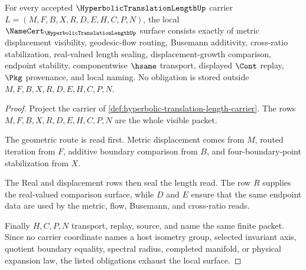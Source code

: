 \begin{theorem}
\label{thm:hyperbolic-translation-length-namecert-obligations}
For every accepted $\HyperbolicTranslationLengthUp$ carrier $L=(M,F,B,X,R,D,E,H,C,P,N)$, the local $\NameCert_{\HyperbolicTranslationLengthUp}$ surface consists exactly of metric displacement visibility, geodesic-flow routing, Busemann additivity, cross-ratio stabilization, real-valued length sealing, displacement-growth comparison, endpoint stability, componentwise $\hsame$ transport, displayed $\Cont$ replay, $\Pkg$ provenance, and local naming. No obligation is stored outside $M,F,B,X,R,D,E,H,C,P,N$.
\end{theorem}
\begin{proof}
Project the carrier of \autoref{def:hyperbolic-translation-length-carrier}. The rows $M,F,B,X,R,D,E,H,C,P,N$ are the whole visible packet.

The geometric route is read first. Metric displacement comes from $M$, routed iteration from $F$, additive boundary comparison from $B$, and four-boundary-point stabilization from $X$.

The Real and displacement rows then seal the length read. The row $R$ supplies the real-valued comparison surface, while $D$ and $E$ ensure that the same endpoint data are used by the metric, flow, Busemann, and cross-ratio reads.

Finally $H,C,P,N$ transport, replay, source, and name the same finite packet. Since no carrier coordinate names a host isometry group, selected invariant axis, quotient boundary equality, spectral radius, completed manifold, or physical expansion law, the listed obligations exhaust the local surface.
\end{proof}

